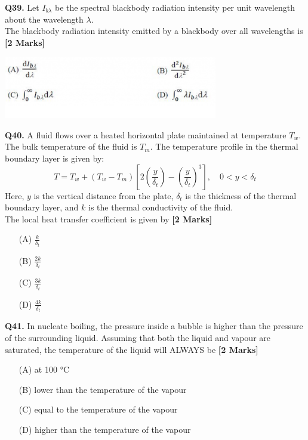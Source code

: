 \documentclass[11pt]{article}
\newcommand{\questionb}[2]{
    \noindent\textbf{Q#2.} #1 \hfill \textbf{[2 Marks]}
}
\begin{document}
\questionb{Let \( I_{b\lambda} \) be the spectral blackbody radiation intensity per unit wavelength about the wavelength \( \lambda \). \\  
The blackbody radiation intensity emitted by a blackbody over all wavelengths is}{39}
\begin{center}
\includegraphics[width=0.7\textwidth]{figures/39.png}
\end{center}
\vspace{0.5cm}

\questionb{A fluid flows over a heated horizontal plate maintained at temperature \( T_w \). The bulk temperature of the fluid is \( T_m \). The temperature profile in the thermal boundary layer is given by:  
\[
T = T_w + (T_w - T_m) \left[ 2 \left( \frac{y}{\delta_t} \right) - \left( \frac{y}{\delta_t} \right)^3 \right], \quad 0 < y < \delta_t
\]  
Here, \( y \) is the vertical distance from the plate, \( \delta_t \) is the thickness of the thermal boundary layer, and \( k \) is the thermal conductivity of the fluid.  
\\ The local heat transfer coefficient is given by}{40}
\begin{enumerate}
    \item[(A)] \( \frac{k}{\delta_t} \)  
    \item[(B)] \( \frac{2k}{\delta_t} \)  
    \item[(C)] \( \frac{3k}{\delta_t} \)  
    \item[(D)] \( \frac{4k}{\delta_t} \)  
\end{enumerate}
\vspace{0.5cm}

\questionb{In nucleate boiling, the pressure inside a bubble is higher than the pressure of the surrounding liquid. Assuming that both the liquid and vapour are saturated, the temperature of the liquid will ALWAYS be}{41}
\begin{enumerate}
    \item[(A)] at 100 °C  
    \item[(B)] lower than the temperature of the vapour  
    \item[(C)] equal to the temperature of the vapour  
    \item[(D)] higher than the temperature of the vapour  
\end{enumerate}
\vspace{0.5cm}
\end{document}

